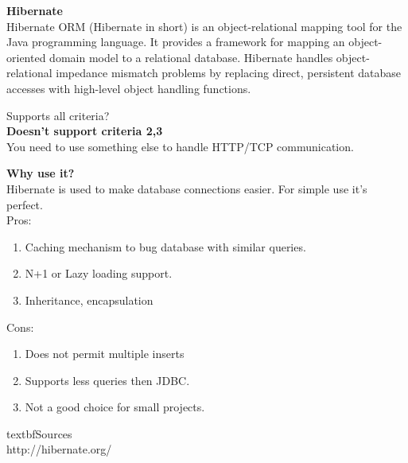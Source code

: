 		\textbf{Hibernate} \\
		Hibernate ORM (Hibernate in short) is an object-relational mapping tool for the Java programming language. It provides a framework for mapping an object-oriented domain model to a relational database. Hibernate handles object-relational impedance mismatch problems by replacing direct, persistent database accesses with high-level object handling functions.
		
		Supports all criteria?\\
		\textbf{Doesn't support criteria 2,3}\\
		You need to use something else to handle HTTP/TCP communication.
		
		\textbf{Why use it?} \\
		Hibernate is used to make database connections easier. For simple use it's perfect.\\
		
		Pros:
		\begin{enumerate}
		\item Caching mechanism to bug database with similar queries.
		\item N+1 or Lazy loading support.
		\item Inheritance, encapsulation
		\end{enumerate}
		Cons:
		\begin{enumerate}
		\item Does not permit multiple inserts
		\item Supports less queries then JDBC.
		\item Not a good choice for small projects.
		\end{enumerate}
	
	textbf{Sources}\\
	http://hibernate.org/